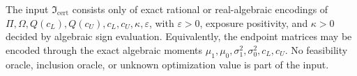 The input \(\mathfrak I_{\mathrm{cert}}\) consists only of exact rational or real-algebraic encodings of \(\Pi,\Omega,Q(c_L),Q(c_U),c_L,c_U,\kappa,\varepsilon\), with \(\varepsilon>0\), exposure positivity, and \(\kappa>0\) decided by algebraic sign evaluation.  Equivalently, the endpoint matrices may be encoded through the exact algebraic moments \(\mu_1,\mu_0,\sigma_1^2,\sigma_0^2,c_L,c_U\).  No feasibility oracle, inclusion oracle, or unknown optimization value is part of the input.